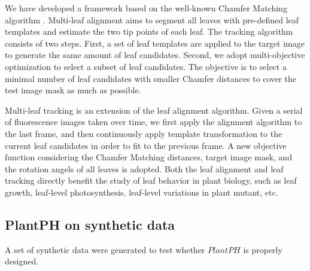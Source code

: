 \documentclass{bioinfo}
\begin{document}
We have developed a framework based on the well-known Chamfer Matching algorithm \citep{yin2014}. Multi-leaf alignment aims to segment all leaves with pre-defined leaf templates and estimate the two tip points of each leaf. The tracking algorithm consists of two steps. First, a set of leaf templates are applied to the target image to generate the same amount of leaf candidates. Second, we adopt multi-objective optimization to select a subset of leaf candidates. The objective is to select a minimal number of leaf candidates with smaller Chamfer distances to cover the test image mask as much as possible.

Multi-leaf tracking is an extension of the leaf alignment algorithm. Given a serial of fluorescence images  taken over time, we first apply the alignment algorithm to the last frame, and then continuously apply template transformation to the current leaf candidates in order to fit to the previous frame. A new objective function considering the Chamfer Matching distances, target image mask, and the rotation angels of all leaves is adopted.
%
Both the leaf alignment and leaf tracking directly benefit the study of leaf behavior in plant biology, such as leaf growth, leaf-level photosynthesis, leaf-level variations in plant mutant, etc.


\subsection{PlantPH on synthetic data}

A set of synthetic data were generated to test whether $PlantPH$ is properly designed.








%
%
\end{document}
